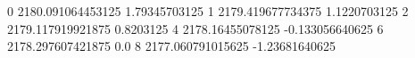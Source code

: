 0 2180.091064453125 1.79345703125
1 2179.419677734375 1.1220703125
2 2179.117919921875 0.8203125
4 2178.16455078125 -0.133056640625
6 2178.297607421875 0.0
8 2177.060791015625 -1.23681640625
